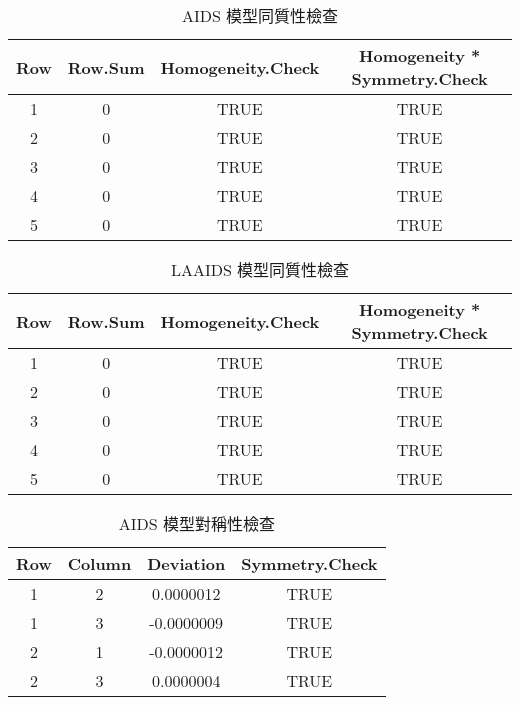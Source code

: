 \begin{table}[H]
    \centering
    \footnotesize
    \caption{AIDS 模型同質性檢查} \label{aids-homo}
    \begin{tabular}{cccc}
        \toprule
        Row & Row.Sum & Homogeneity.Check & Homogeneity * Symmetry.Check \\
        \midrule
        1 & 0 & TRUE & TRUE \\
        2 & 0 & TRUE & TRUE \\
        3 & 0 & TRUE & TRUE \\
        4 & 0 & TRUE & TRUE \\
        5 & 0 & TRUE & TRUE \\
        \bottomrule
    \end{tabular}
\end{table}

\begin{table}[H]
    \centering
    \footnotesize
    \caption{LAAIDS 模型同質性檢查} \label{laaids-homo}
    \begin{tabular}{cccc}
        \toprule
        Row & Row.Sum & Homogeneity.Check & Homogeneity * Symmetry.Check \\
        \midrule
        1 & 0 & TRUE & TRUE \\
        2 & 0 & TRUE & TRUE \\
        3 & 0 & TRUE & TRUE \\
        4 & 0 & TRUE & TRUE \\
        5 & 0 & TRUE & TRUE \\
        \bottomrule
    \end{tabular}
\end{table}

\begin{table}[H]
    \centering
    \footnotesize
    \caption{AIDS 模型對稱性檢查} \label{aids-sym}
    \begin{tabular}{cccc}
        \toprule
        Row & Column & Deviation & Symmetry.Check \\
        \midrule
        1 & 2 & 0.0000012 & TRUE \\
        1 & 3 & -0.0000009 & TRUE \\
        2 & 1 & -0.0000012 & TRUE \\
        2 & 3 & 0.0000004 & TRUE \\
        \bottomrule
    \end{tabular}
\end{table}

